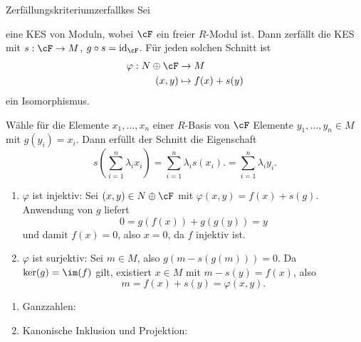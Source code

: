 \begin{satz}{Zerfällungskriterium}{zerfallkes}
Sei 
\begin{center}
\end{center}
eine KES von Moduln, wobei $\cF$ ein freier $R$-Modul ist. Dann zerfällt die KES mit $s: \cF \to M$, $g \circ s = \id_\cF$. Für jeden solchen Schnitt ist 
\begin{equation}
\begin{split}
\varphi: N \oplus \cF &\to M\\
(x,y) &\mapsto f(x) + s(y)
\end{split}
\end{equation}
ein Isomorphismus.
\end{satz}
\begin{beweis}
Wähle für die Elemente $x_1, \dots, x_n$ einer $R$-Basis von $\cF$ Elemente $y_1, \dots, y_n \in M$ mit $g(y_i)=x_i$. Dann erfüllt der Schnitt die Eigenschaft 
\begin{equation}
s\left( \sum_{i=1}^n \lambda_i x_i \right) = \sum_{i=1}^n \lambda_i s(x_i). = \sum_{i=1}^n \lambda_i y_i.
\end{equation}
\begin{enumerate}
\item $\varphi$ ist injektiv: Sei $(x,y)\in N \oplus \cF$ mit $\varphi(x,y) =f(x)+s(g)$. Anwendung von $g$ liefert
\begin{equation}
0 = g\left( f(x)\right) + g \left( g(y) \right) = y
\end{equation}
und damit $f(x)=0$, also $x=0$, da $f$ injektiv ist.
\item $\varphi$ ist surjektiv: Sei $m \in M$, also $g(m-s(g(m))) = 0$. Da $\ker (g) = \im (f)$ gilt, existiert $x \in M$ mit $m-s(y)=f(x)$, also
\begin{equation}
m = f(x)+s(y)=\varphi(x,y).
\end{equation}
\end{enumerate}
\end{beweis}
\begin{beispiele}
\begin{enumerate}
\item Ganzzahlen:
\begin{center}
\end{center}
\item Kanonische Inklusion und Projektion:
\begin{center}
\end{center}
\end{enumerate}
\end{beispiele}

